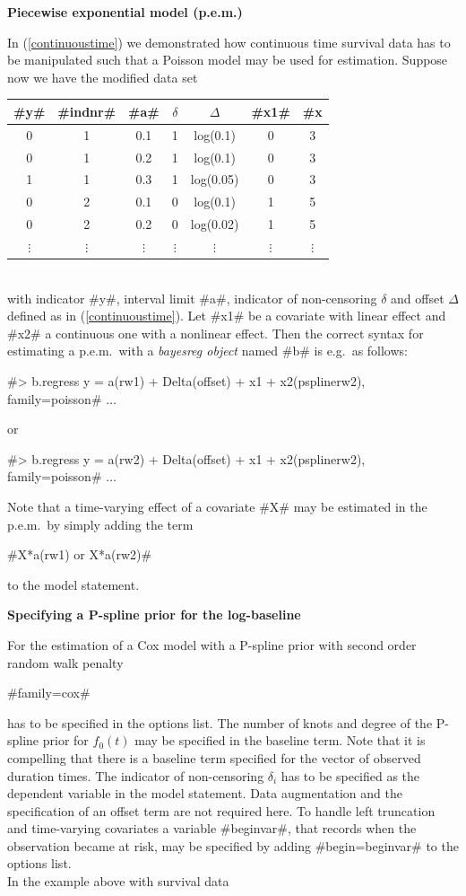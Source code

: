 \textbf{Piecewise exponential model (p.e.m.)}

In (\autoref{continuoustime}) we demonstrated how continuous time
survival data has to be manipulated such that a Poisson model may
be used for estimation. Suppose now we have the modified data set
\vspace{0.5cm}\\
\begin{tabular}{c|c|c|c|c|c|c}
#y# & #indnr# & #a# & $\delta$ &  $\Delta$ &   #x1# &
#x#2\\\hline\hline
0 &  1 &   0.1 &   1  &  log(0.1) & 0  & 3\\
0  & 1   & 0.2  &  1  &  log(0.1) & 0 &  3\\
1  & 1   & 0.3  &  1  &  log(0.05)& 0  & 3\\\hline
0 &  2 &   0.1 &   0 &   log(0.1) & 1 &  5\\
0  & 2  &  0.2 &   0  &  log(0.02)& 1 &  5\\\hline
$\vdots$ & $\vdots$ & $\vdots$ & $\vdots$ & $\vdots$ & $\vdots$& $\vdots$\\
\end{tabular}
\vspace{0.5cm}\\
with indicator #y#, interval limit #a#, indicator of non-censoring
$\delta$ and offset $\Delta$ defined as in
(\autoref{continuoustime}). Let #x1# be a covariate with linear
effect and #x2# a continuous one with a nonlinear effect. Then the
correct syntax for estimating a p.e.m.~with a {\em bayesreg
object} named #b# is e.g.~as follows:

 #> b.regress y = a(rw1) + Delta(offset) + x1 + x2(psplinerw2), family=poisson# $\ldots$

or

 #> b.regress y = a(rw2) + Delta(offset) + x1 + x2(psplinerw2), family=poisson# $\ldots$


Note that a time-varying effect of a covariate #X# may be
estimated in the p.e.m.~by simply adding the term

#X*a(rw1) or X*a(rw2)#

to the model statement.

\textbf{Specifying a P-spline prior for the log-baseline}

For the estimation of a Cox model with a P-spline prior with
second order random walk penalty

#family=cox#

has to be specified in the options list. The number of knots and
degree of the P-spline prior for $f_0(t)$ may be specified in the
baseline term. Note that it is compelling that there is a baseline
term specified for the vector of observed duration times. The
indicator of non-censoring $\delta_i$ has to be specified as the
dependent variable in the model statement. Data augmentation and the
specification of an offset term are not required here. To handle
left truncation and time-varying covariates a variable #beginvar#,
that records when the observation became at risk, may be specified
by adding #begin=beginvar# to
the options list.\\
In the example above with survival data

